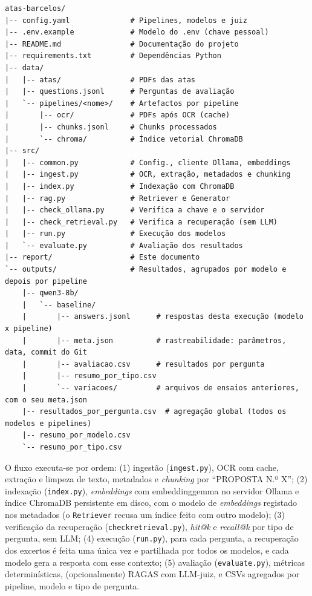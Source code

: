 \documentclass[11pt]{article}
\renewcommand{\_}{\textunderscore\allowbreak}
\begin{document}
\begin{verbatim}
atas-barcelos/
|-- config.yaml              # Pipelines, modelos e juiz
|-- .env.example             # Modelo do .env (chave pessoal)
|-- README.md                # Documentação do projeto
|-- requirements.txt         # Dependências Python
|-- data/
|   |-- atas/                # PDFs das atas
|   |-- questions.jsonl      # Perguntas de avaliação
|   `-- pipelines/<nome>/    # Artefactos por pipeline
|       |-- ocr/             # PDFs após OCR (cache)
|       |-- chunks.jsonl     # Chunks processados
|       `-- chroma/          # Índice vetorial ChromaDB
|-- src/
|   |-- common.py            # Config., cliente Ollama, embeddings
|   |-- ingest.py            # OCR, extração, metadados e chunking
|   |-- index.py             # Indexação com ChromaDB
|   |-- rag.py               # Retriever e Generator
|   |-- check_ollama.py      # Verifica a chave e o servidor
|   |-- check_retrieval.py   # Verifica a recuperação (sem LLM)
|   |-- run.py               # Execução dos modelos
|   `-- evaluate.py          # Avaliação dos resultados
|-- report/                  # Este documento
`-- outputs/                 # Resultados, agrupados por modelo e depois por pipeline
    |-- qwen3-8b/
    |   `-- baseline/
    |       |-- answers.jsonl      # respostas desta execução (modelo x pipeline)
    |       |-- meta.json          # rastreabilidade: parâmetros, data, commit do Git
    |       |-- avaliacao.csv      # resultados por pergunta
    |       |-- resumo_por_tipo.csv
    |       `-- variacoes/         # arquivos de ensaios anteriores, com o seu meta.json
    |-- resultados_por_pergunta.csv  # agregação global (todos os modelos e pipelines)
    |-- resumo_por_modelo.csv
    `-- resumo_por_tipo.csv
\end{verbatim}

O fluxo executa-se por ordem: (1) ingestão (\texttt{ingest.py}), OCR com cache, extração e limpeza de texto, metadados e \textit{chunking} por ``PROPOSTA N.º X''; (2) indexação (\texttt{index.py}), \textit{embeddings} com embeddinggemma no servidor Ollama e índice ChromaDB persistente em disco, com o modelo de \textit{embeddings} registado nos metadados (o \texttt{Retriever} recusa um índice feito com outro modelo); (3) verificação da recuperação (\texttt{check\_retrieval.py}), \textit{hit@k} e \textit{recall@k} por tipo de pergunta, sem LLM; (4) execução (\texttt{run.py}), para cada pergunta, a recuperação dos excertos é feita uma única vez e partilhada por todos os modelos, e cada modelo gera a resposta com esse contexto; (5) avaliação (\texttt{evaluate.py}), métricas determinísticas, (opcionalmente) RAGAS com LLM-juiz, e CSVs agregados por pipeline, modelo e tipo de pergunta.
\end{document}
